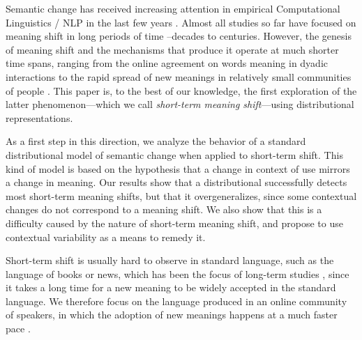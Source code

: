 Semantic change has received increasing attention in empirical Computational Linguistics / NLP in the last few years \cite{tang2018state,KutuzovEtal-coling2018}. Almost all studies so far have focused on meaning shift in long periods of time --decades to centuries. However, the genesis of meaning shift and the mechanisms that produce it operate at much shorter time spans, ranging
from the online agreement on words meaning in dyadic interactions \cite{brennan1996conceptual} to the rapid spread of new meanings in relatively small communities of people \cite{wenger1998communities,eckert-mcconnellginet1992}. 
This paper is, to the best of our knowledge, the first exploration of the latter phenomenon---which we call \textit{short-term meaning shift}---using distributional representations.
 

As a first step in this direction, we analyze the
 behavior of a standard distributional model of semantic change when
 applied to short-term shift.
This kind of model is based on the hypothesis that a change in context of use mirrors a change in meaning.
Our results show that a distributional successfully detects most short-term meaning shifts, but that it overgeneralizes, since some contextual changes do not correspond to a meaning shift.
We also show that this is a difficulty caused by the nature of short-term meaning shift, and propose to use contextual variability as a means to remedy it.

 

Short-term shift is usually hard to observe in standard language, such
as the language of books or news, which has been the focus of
long-term studies \cite[e.g.,][]{hamilton2016diachronic,kulkarni2015statistically}, since
it takes a long time for a new meaning to be widely accepted in the standard language. 
We therefore focus on the language produced in an online community of speakers, in which the 
adoption of new meanings happens at a much faster pace \cite{Clark96,hasan2009}.

